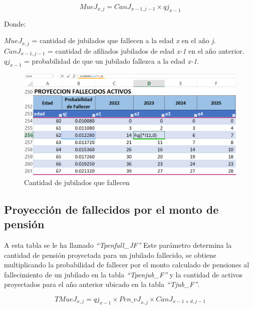 \documentclass[
  letterpaper,
  DIV=11,
  numbers=noendperiod]{scrreprt}
\begin{document}
\begin{equation}
MueJ_{x,j}=CanJ_{x-1,j-1}\times{qj}_{x-1}
\end{equation}

Donde:

\(MueJ_{x,j}\) = cantidad de jubilados que fallecen a la edad \emph{x}
en el año \emph{j}.\\
\(CanJ_{x-1,j-1}\) = cantidad de afiliados jubilados de edad \emph{x-1}
en el año anterior.\\
\({qj}_{x-1}\) = probabilidad de que un jubilado fallezca a la edad
\emph{x-1}.

\begin{figure}

{\centering \includegraphics{images/F/Img32.png}

}

\caption{Cantidad de jubilados que fallecen}

\end{figure}

\hypertarget{proyecciuxf3n-de-fallecidos-por-el-monto-de-pensiuxf3n-1}{%
\subsection{Proyección de fallecidos por el monto de
pensión}\label{proyecciuxf3n-de-fallecidos-por-el-monto-de-pensiuxf3n-1}}

A esta tabla se le ha llamado \emph{``Tpenfall\_JF''} Este parámetro
determina la cantidad de pensión proyectada para un jubilado fallecido,
se obtiene multiplicando la probabilidad de fallecer por el monto
calculado de pensiones al fallecimiento de un jubilado en la tabla
\emph{``Tpenjub\_F''} y la cantidad de activos proyectados para el año
anterior ubicado en la tabla \emph{``Tjub\_F''}.

\begin{equation}
{TMueJ}_{x,j}={qj}_{x-1}\times{Pen\_vJ}_{x,j}\times{CanJ}_{x-1+d,j-1}
\end{equation}
\end{document}
